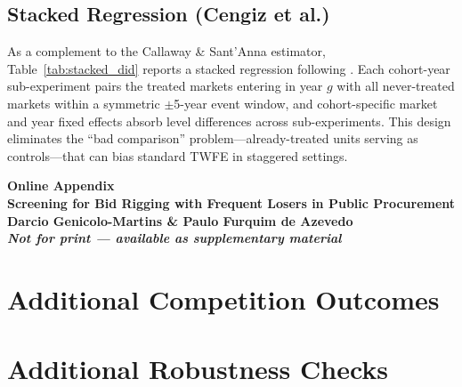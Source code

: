 \subsection{Stacked Regression (Cengiz et al.)}

As a complement to the Callaway \& Sant'Anna estimator,
Table~\ref{tab:stacked_did} reports a stacked regression following
\citet{cengiz2019effect}. Each cohort-year sub-experiment pairs the
treated markets entering in year $g$ with all never-treated markets
within a symmetric $\pm$5-year event window, and cohort-specific
market and year fixed effects absorb level differences across
sub-experiments. This design eliminates the ``bad comparison''
problem---already-treated units serving as controls---that can bias
standard TWFE in staggered settings.




\clearpage
\setcounter{page}{1}
\begin{center}
\Large\bfseries Online Appendix\\[6pt]
\large Screening for Bid Rigging with Frequent Losers in Public Procurement\\[4pt]
\normalsize Darcio Genicolo-Martins \& Paulo Furquim de Azevedo\\[6pt]
\itshape Not for print --- available as supplementary material
\end{center}
\bigskip

\section{Additional Competition Outcomes}
\label{app:online_competition}









\section{Additional Robustness Checks}
\label{app:online_robustness}

